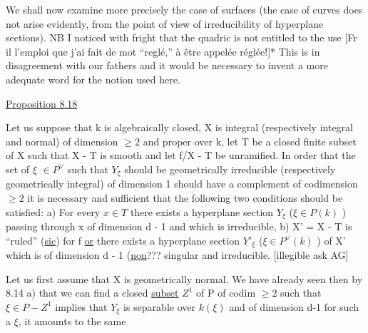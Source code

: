 
We shall now examine more precisely the case of surfaces (the
case of curves does not arise evidently, from the point of view of
irreducibility of hyperplane sections).
NB  I noticed with fright that the quadric is not entitled to the
use [Fr il l'emploi que j'ai fait de mot
``reglé,'' à être appelée réglée!]*
This is in disagreement with our fathers and it would be necessary
to invent a more adequate word for the notion used here.

\uline{Proposition 8.18}

Let us suppose that k is algebraically closed, X is integral
(respectively integral and normal) of dimension $\geq 2$ and proper
over k, let T be a closed finite subset of X such that X - T is
smooth and let f/X - T be unramified.  In order that the set of $\xi$
$\in P^{\vee}$ such that $Y_{\xi}$ should be geometrically irreducible (respectively
geometrically integral) of dimension 1 should have a complement of
codimension $\geq 2$ it is necessary and sufficient that the following
two conditions should be satisfied:  a) For every $x \in T$ there
exists a hyperplane section $Y_{\xi}$ ($\xi \in P(k)$ ) passing through x of
dimension d - 1 and which is irreducible, b) X' = X - T is ``ruled''
(\uline{sic}) for f \uline{or} there exists a hyperplane section $Y'_{\xi}$ ($\xi \in P^{\vee}(k)$ ) of
X' which is of dimension d - 1 (\uline{non}??? singular and irreducible.
[illegible ask AG]

Let us first assume that X is geometrically normal.  We have
already seen then by 8.14  a) that we can find a closed \uline{subset} $Z^{1}$
of P of codim $\geq 2$ such that $\xi \in P-Z^{1}$ implies that $Y_{\xi}$ is separable
over $k(\xi)$ and of dimension d-1 for such a $\xi$, it amounts to the same

